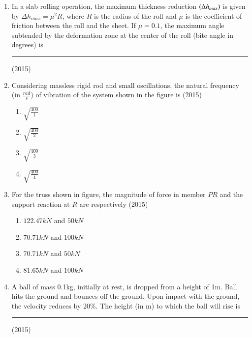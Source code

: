 \documentclass[journal]{IEEEtran}
\begin{document}
\begin{enumerate}
    
    \item In a slab rolling operation, the maximum thickness reduction $\left(\Delta h_{max}\right)$ is given by $\Delta h_{max}=\mu^2R$, where $R$ is the radius of the roll and $\mu$ is the coefficient of friction between the roll and the sheet. If $\mu=0.1$, the maximum angle subtended by the deformation zone at the center of the roll (bite angle in degrees) is \rule{1cm}{0.15mm}
    \hfill{(2015)}

        
    \item Considering massless rigid rod and small oscillations, the natural frequency (in $\frac{rad}{s}$) of vibration of the system shown in the figure is
    \hfill{(2015)}

    

    \begin{multicols}{4}
        \begin{enumerate}
            \item $\sqrt{\frac{400}{1}}$
            \item $\sqrt{\frac{400}{2}}$
            \item $\sqrt{\frac{400}{3}}$
            \item $\sqrt{\frac{400}{4}}$
        \end{enumerate}
    \end{multicols}

    
    \item For the truss shown in figure, the magnitude of force in member $PR$ and the support reaction at $R$ are respectively
    \hfill{(2015)}
    
    


    \begin{multicols}{2}
        \begin{enumerate}
            \item $122.47kN$ and $50kN$
            \item $70.71kN$ and $100kN$
            \item $70.71kN$ and $50kN$
            \item $81.65kN$ and $100kN$
        \end{enumerate}
    \end{multicols}

    
    \item A ball of mass 0.1kg, initially at rest, is dropped from a height of 1m. Ball hits the ground and bounces off the ground. Upon impact with the ground, the velocity reduces by 20\%. The height (in m) to which the ball will rise is \rule{1cm}{0.15mm}
    \hfill{(2015)}


\end{enumerate}
\end{document}

